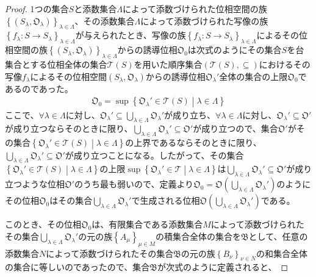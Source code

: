 \documentclass[dvipdfmx]{jsarticle}
\begin{document}
\begin{proof}
1つの集合$S$と添数集合$\varLambda$によって添数づけられた位相空間の族$\left\{ \left( S_{\lambda},\mathfrak{O}_{\lambda} \right) \right\}_{\lambda \in \varLambda}$、その添数集合$\varLambda$によって添数づけられた写像の族$\left\{ f_{\lambda}:S \rightarrow S_{\lambda} \right\}_{\lambda \in \varLambda}$が与えられたとき、写像の族$\left\{ f_{\lambda}:S \rightarrow S_{\lambda} \right\}_{\lambda \in \varLambda}$によるその位相空間の族$\left\{ \left( S_{\lambda},\mathfrak{O}_{\lambda} \right) \right\}_{\lambda \in \varLambda}$からの誘導位相$\mathfrak{O}_{0}$は次式のようにその集合$S$を台集合とする位相全体の集合$\mathcal{T}(S)$を用いた順序集合$\left( \mathcal{T}(S), \subseteq \right)$におけるその写像$f_{\lambda}$によるその位相空間$\left( S_{\lambda},\mathfrak{O}_{\lambda} \right)$からの誘導位相$\mathfrak{O}_{\lambda}'$全体の集合の上限$\mathfrak{O}_{0}$であるのであった。
\begin{align*}
\mathfrak{O}_{0} = \sup\left\{ \mathfrak{O}_{\lambda}'\in \mathcal{T}(S) \middle| \lambda \in \varLambda \right\}
\end{align*}
ここで、$\forall\lambda \in \varLambda$に対し、$\mathfrak{O}_{\lambda}' \subseteq \bigcup_{\lambda \in \varLambda} \mathfrak{O}_{\lambda}'$が成り立ち、$\forall\lambda \in \varLambda$に対し、$\mathfrak{O}_{\lambda}' \subseteq \mathfrak{O}'$が成り立つならそのときに限り、$\bigcup_{\lambda \in \varLambda} \mathfrak{O}_{\lambda}' \subseteq \mathfrak{O}'$が成り立つので、集合$\mathfrak{O}'$がその集合$\left\{ \mathfrak{O}_{\lambda}'\in \mathcal{T}(S) \middle| \lambda \in \varLambda \right\}$の上界であるならそのときに限り、$\bigcup_{\lambda \in \varLambda} \mathfrak{O}_{\lambda}' \subseteq \mathfrak{O}'$が成り立つことになる。したがって、その集合$\left\{ \mathfrak{O}_{\lambda}'\in \mathcal{T}(S) \middle| \lambda \in \varLambda \right\}$の上限$\sup\left\{ \mathfrak{O}_{\lambda}'\in \mathcal{T} \middle| \lambda \in \varLambda \right\}$は$\bigcup_{\lambda \in \varLambda} \mathfrak{O}_{\lambda}' \subseteq \mathfrak{O}'$が成り立つような位相$\mathfrak{O}'$のうち最も弱いので、定義より$\mathfrak{O}_{0} = \mathfrak{O}\left( \bigcup_{\lambda \in \varLambda} \mathfrak{O}_{\lambda}' \right)$のようにその位相$\mathfrak{O}_{0}$はその集合$\bigcup_{\lambda \in \varLambda} \mathfrak{O}_{\lambda}'$で生成される位相$\mathfrak{O}\left( \bigcup_{\lambda \in \varLambda} \mathfrak{O}_{\lambda}' \right)$である。\par
このとき、その位相$\mathfrak{O}_{0}$は、有限集合である添数集合$M$によって添数づけられたその集合$\bigcup_{\lambda \in \varLambda} \mathfrak{O}_{\lambda}'$の元の族$\left\{ A_{\mu} \right\}_{\mu \in M}$の積集合全体の集合を$\mathfrak{B}$として、任意の添数集合$N$によって添数づけられたその集合$\mathfrak{B}$の元の族$\left\{ B_{\nu} \right\}_{\nu \in N}$の和集合全体の集合に等しいのであったので、集合$\mathfrak{B}$が次式のように定義されると、

\end{proof}
\end{document}
